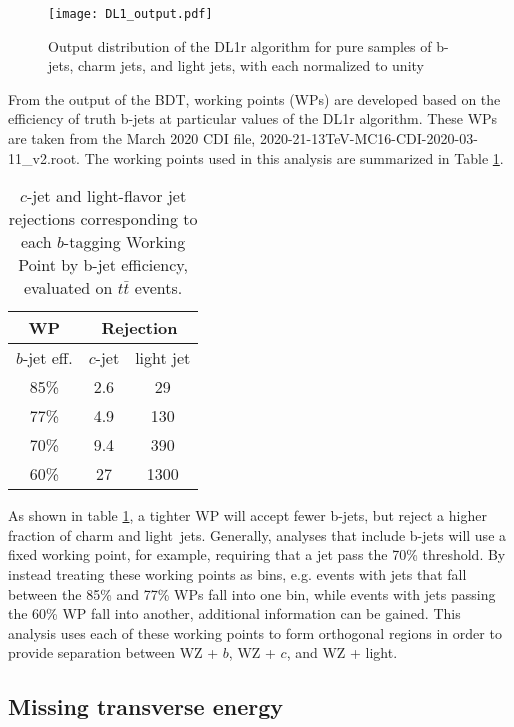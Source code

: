 \begin{figure}[H] 
    \centering
    \texttt{[image: DL1\_output.pdf]} 
    \caption{Output distribution of the DL1r algorithm for pure samples of b-jets, charm jets, and light jets, with each normalized to unity \cite{btag_cal}}
    \label{fig:DL1r}
\end{figure}

From the output of the BDT, working points (WPs) are developed based on the efficiency of truth b-jets at particular values of the DL1r algorithm. These WPs are taken from the March 2020 CDI file, 2020-21-13TeV-MC16-CDI-2020-03-11\_v2.root. The working points used in this analysis are summarized in Table \ref{tab:btag_WPs}. 

\begin{table}[H] 
\begin{center}
\begin{tabular}{|c|c|c|}
     \hline
    WP & \multicolumn{2}{c|}{Rejection}\\
    \hline
    $b$-jet eff. & $c$-jet & light jet\\
    \hline
     85\% & 2.6 & 29 \\
     77\% & 4.9 & 130 \\
     70\% & 9.4 & 390 \\
     60\% & 27 & 1300 \\
     \hline
     \end{tabular}
    \caption{$c$-jet and light-flavor jet rejections corresponding to each $b$-tagging Working Point by b-jet efficiency, evaluated on $t\bar{t}$ events.}
     \label{tab:btag_WPs}
     \end{center}
\end{table}

As shown in table \ref{tab:btag_WPs}, a tighter WP will accept fewer b-jets, but reject a higher fraction of charm and light\
 jets. Generally, analyses that include b-jets will use a fixed working point, for example, requiring that a jet pass the 70\% threshold. By instead treating these working points as bins, e.g. events with jets that fall between the 85\% and 77\% WPs fall into one bin, while events with jets passing the 60\% WP fall into another, additional information can be gained. This analysis uses each of these working points to form orthogonal regions in order to provide separation between WZ + $b$, WZ + $c$, and WZ + light.

\subsection{Missing transverse energy}
\label{subsec:met}

